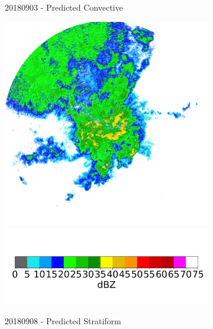 \begin{figure}[ht]
\begin{subfigure}[b]{0.45\textwidth}
		\caption{20180903 - Predicted Convective}
		\label{fig:classifying_datadiscovery_ex5}
	\end{subfigure}
	\begin{subfigure}[b]{0.45\textwidth}
		\includegraphics[width=\textwidth]{./thesis_code/plots/midlothian-tx-20180908-173505-ref.png}
		\includegraphics[width=\textwidth]{./thesis_code/plots/dfw_colormap.png}
		\caption{20180908 - Predicted Stratiform}
		\label{fig:classifying_datadiscovery_ex6}
	\end{subfigure}
	\begin{subfigure}[b]{0.45\textwidth}

\end{subfigure}
\end{figure}
